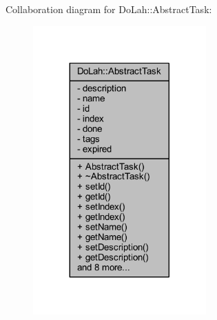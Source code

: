 Collaboration diagram for Do\+Lah\+:\+:Abstract\+Task\+:\nopagebreak
\begin{figure}[H]
\begin{center}
\leavevmode
\includegraphics[width=188pt]{class_do_lah_1_1_abstract_task__coll__graph}
\end{center}
\end{figure}
